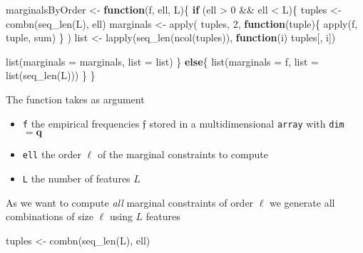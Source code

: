 \documentclass[
]{article}
\newenvironment{Shaded}{\begin{snugshade}}{\end{snugshade}}
\newcommand{\AttributeTok}[1]{\textcolor[rgb]{0.77,0.63,0.00}{#1}}
\newcommand{\ControlFlowTok}[1]{\textcolor[rgb]{0.13,0.29,0.53}{\textbf{#1}}}
\newcommand{\DecValTok}[1]{\textcolor[rgb]{0.00,0.00,0.81}{#1}}
\newcommand{\FunctionTok}[1]{\textcolor[rgb]{0.00,0.00,0.00}{#1}}
\newcommand{\NormalTok}[1]{#1}
\newcommand{\OtherTok}[1]{\textcolor[rgb]{0.56,0.35,0.01}{#1}}
\newcommand{\SpecialCharTok}[1]{\textcolor[rgb]{0.00,0.00,0.00}{#1}}
\providecommand{\tightlist}{%
  \setlength{\itemsep}{0pt}\setlength{\parskip}{0pt}}
\newcommand{\prob}[1]{\mathfrak{#1}}
\begin{document}
\begin{Shaded}
\begin{Highlighting}[]
\NormalTok{marginalsByOrder }\OtherTok{\textless{}{-}} \ControlFlowTok{function}\NormalTok{(f, ell, L)\{}
  \ControlFlowTok{if}\NormalTok{ (ell }\SpecialCharTok{\textgreater{}} \DecValTok{0} \SpecialCharTok{\&\&}\NormalTok{ ell }\SpecialCharTok{\textless{}}\NormalTok{ L)\{}
\NormalTok{    tuples }\OtherTok{\textless{}{-}} \FunctionTok{combn}\NormalTok{(}\FunctionTok{seq\_len}\NormalTok{(L), ell)}
\NormalTok{    marginals }\OtherTok{\textless{}{-}} \FunctionTok{apply}\NormalTok{(}
\NormalTok{      tuples, }\DecValTok{2}\NormalTok{,}
      \ControlFlowTok{function}\NormalTok{(tuple)\{}
        \FunctionTok{apply}\NormalTok{(f, tuple, sum)}
\NormalTok{      \}}
\NormalTok{    )}
\NormalTok{    list }\OtherTok{\textless{}{-}} \FunctionTok{lapply}\NormalTok{(}\FunctionTok{seq\_len}\NormalTok{(}\FunctionTok{ncol}\NormalTok{(tuples)), }\ControlFlowTok{function}\NormalTok{(i) tuples[, i])}
    
    \FunctionTok{list}\NormalTok{(}\AttributeTok{marginals =}\NormalTok{ marginals, }\AttributeTok{list =}\NormalTok{ list)}
\NormalTok{  \} }\ControlFlowTok{else}\NormalTok{\{}
    \FunctionTok{list}\NormalTok{(}\AttributeTok{marginals =}\NormalTok{ f, }\AttributeTok{list =} \FunctionTok{list}\NormalTok{(}\FunctionTok{seq\_len}\NormalTok{(L)))}
\NormalTok{  \}}
\NormalTok{\}}
\end{Highlighting}
\end{Shaded}

The function takes as argument

\begin{itemize}
\tightlist
\item
  \texttt{f} the empirical frequencies \(\prob f\) stored in a
  multidimensional \texttt{array} with \texttt{dim} \(=\mathbf q\)
\item
  \texttt{ell} the order \(\ell\) of the marginal constraints to compute
\item
  \texttt{L} the number of features \(L\)
\end{itemize}

As we want to compute \emph{all} marginal constraints of order \(\ell\)
we generate all combinations of size \(\ell\) using \(L\) features

\begin{Shaded}
\begin{Highlighting}[]
\NormalTok{tuples }\OtherTok{\textless{}{-}} \FunctionTok{combn}\NormalTok{(}\FunctionTok{seq\_len}\NormalTok{(L), ell)}
\end{Highlighting}
\end{Shaded}
\end{document}

